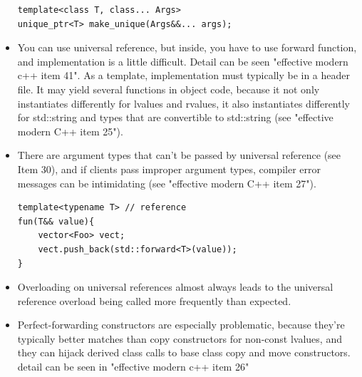 \documentclass[a4paper,11pt,twoside]{book}
\begin{document}
\begin{itemize}
\begin{lstlisting}[numbers=none]
template<class T, class... Args> 
unique_ptr<T> make_unique(Args&&... args); 
\end{lstlisting}

    \item You can use universal reference,  but inside, you have to use forward function, and implementation is a little difficult.  Detail can be seen "effective modern c++ item 41". As a template, implementation must typically be in a header file. It may yield several functions in object code, because it not only instantiates differently for lvalues and rvalues, it also instantiates differently for std::string and types that are convertible to std::string (see "effective modern C++ item 25"). 

    \item There are argument types that can't be passed by universal reference (see Item 30), and if clients pass improper argument types, compiler error messages can be intimidating (see "effective modern C++ item 27").

\begin{lstlisting}[numbers=none]
template<typename T> // reference
fun(T&& value){
	vector<Foo> vect;
	vect.push_back(std::forward<T>(value)); 
}
\end{lstlisting}

    \item Overloading on universal references almost always leads to the universal reference overload being called more frequently than expected.

    \item Perfect-forwarding constructors are especially problematic, because they're typically better matches than copy constructors for non-const lvalues, and they can hijack derived class calls to base class copy and move constructors. detail can be seen in "effective modern c++ item 26"

\end{itemize}
\end{document}
